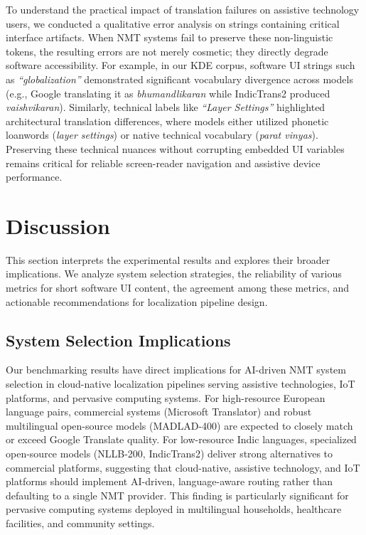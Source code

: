 \documentclass[pdflatex,sn-mathphys-num]{sn-jnl}
\begin{document}
To understand the practical impact of translation failures on assistive technology users, we conducted a qualitative error analysis on strings containing critical interface artifacts. When NMT systems fail to preserve these non-linguistic tokens, the resulting errors are not merely cosmetic; they directly degrade software accessibility. For example, in our KDE corpus, software UI strings such as \textit{``globalization''} demonstrated significant vocabulary divergence across models (e.g., Google translating it as \textit{bhumandlikaran} while IndicTrans2 produced \textit{vaishvikaran}). Similarly, technical labels like \textit{``Layer Settings''} highlighted architectural translation differences, where models either utilized phonetic loanwords (\textit{layer settings}) or native technical vocabulary (\textit{parat vinyas}). Preserving these technical nuances without corrupting embedded UI variables remains critical for reliable screen-reader navigation and assistive device performance.

\section{Discussion}

This section interprets the experimental results and explores their broader implications. We analyze system selection strategies, the reliability of various metrics for short software UI content, the agreement among these metrics, and actionable recommendations for localization pipeline design.

\subsection{System Selection Implications}

Our benchmarking results have direct implications for AI-driven NMT system selection in cloud-native localization pipelines serving assistive technologies, IoT platforms, and pervasive computing systems. For high-resource European language pairs, commercial systems (Microsoft Translator) and robust multilingual open-source models (MADLAD-400) are expected to closely match or exceed Google Translate quality. For low-resource Indic languages, specialized open-source models (NLLB-200, IndicTrans2) deliver strong alternatives to commercial platforms, suggesting that cloud-native, assistive technology, and IoT platforms should implement AI-driven, language-aware routing rather than defaulting to a single NMT provider. This finding is particularly significant for pervasive computing systems deployed in multilingual households, healthcare facilities, and community settings.
\end{document}
